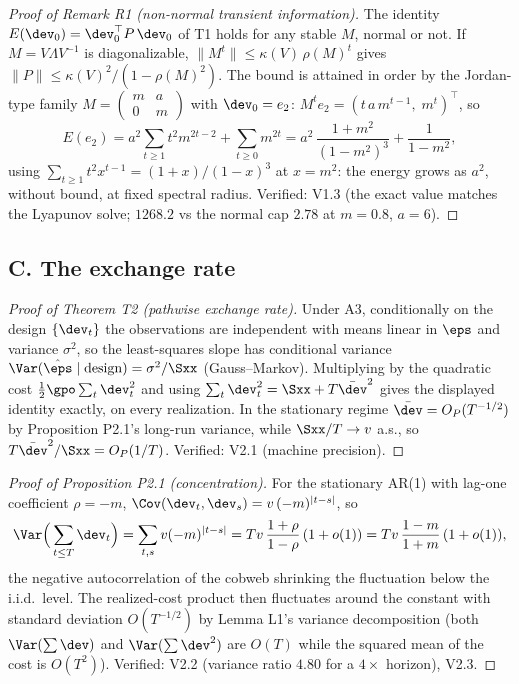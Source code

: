 \documentclass[11pt]{article}
\begin{document}
\begin{proof}[Proof of Remark R1 (non-normal transient information)]
The identity $E(\dev_0) = \dev_0^\top P\,\dev_0$ of T1 holds for any stable
$M$, normal or not. If $M = V\Lambda V^{-1}$ is diagonalizable,
$\|M^t\| \le \kappa(V)\,\rho(M)^t$ gives
$\|P\| \le \kappa(V)^2/(1-\rho(M)^2)$. The bound is attained in order by the
Jordan-type family $M = \begin{pmatrix} m & a \\ 0 & m\end{pmatrix}$ with
$\dev_0 = e_2$: $M^t e_2 = (t\,a\,m^{t-1},\; m^t)^\top$, so
\[
E(e_2) = a^2 \sum_{t\ge 1} t^2 m^{2t-2} + \sum_{t \ge 0} m^{2t}
 = a^2\,\frac{1+m^2}{(1-m^2)^3} + \frac{1}{1-m^2},
\]
using $\sum_{t\ge1} t^2 x^{t-1} = (1+x)/(1-x)^3$ at $x = m^2$: the energy
grows as $a^2$, without bound, at fixed spectral radius. Verified: V1.3
(the exact value matches the Lyapunov solve; $1268.2$ vs the normal cap
$2.78$ at $m = 0.8$, $a = 6$).
\end{proof}

\subsection*{C. The exchange rate}

\begin{proof}[Proof of Theorem T2 (pathwise exchange rate)]
Under A3, conditionally on the design $\{\dev_t\}$ the observations are
independent with means linear in $\eps$ and variance $\sigma^2$, so the
least-squares slope has conditional variance
$\Var(\hat\eps \mid \mathrm{design}) = \sigma^2/\Sxx$ (Gauss--Markov).
Multiplying by the quadratic cost $\tfrac{1}{2}\gpo \sum_t \dev_t^2$ and
using $\sum_t \dev_t^2 = \Sxx + T\bar\dev^2$ gives the displayed identity
exactly, on every realization. In the stationary regime
$\bar\dev = O_P(T^{-1/2})$ by Proposition P2.1's long-run variance, while
$\Sxx/T \to v$ a.s., so $T\bar\dev^2/\Sxx = O_P(1/T)$. Verified: V2.1
(machine precision).
\end{proof}

\begin{proof}[Proof of Proposition P2.1 (concentration)]
For the stationary AR(1) with lag-one coefficient $\rho = -m$,
$\Cov(\dev_t, \dev_s) = v\,(-m)^{|t-s|}$, so
\[
\Var\Big(\sum_{t \le T}\dev_t\Big) = \sum_{t,s} v (-m)^{|t-s|}
 = T v\,\frac{1+\rho}{1-\rho}\,(1+o(1)) = T v\,\frac{1-m}{1+m}\,(1+o(1)),
\]
the negative autocorrelation of the cobweb shrinking the fluctuation below
the i.i.d.\ level. The realized-cost product then fluctuates around the
constant with standard deviation $O(T^{-1/2})$ by Lemma L1's variance
decomposition (both $\Var(\sum\dev)$ and $\Var(\sum\dev^2)$ are $O(T)$
while the squared mean of the cost is $O(T^2)$). Verified: V2.2 (variance
ratio $4.80$ for a $4\times$ horizon), V2.3.
\end{proof}
\end{document}
